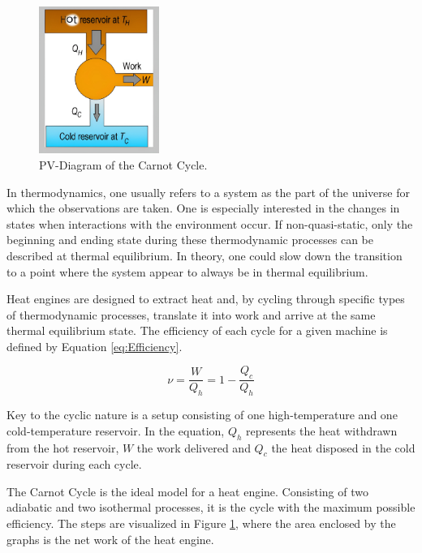 \begin{figure}  %
    \centering
    \vspace{-0.75cm}
    \includegraphics[width=0.35\textwidth]{Graphics/Heat_Engine.png}  %
    \caption{PV-Diagram of the Carnot Cycle. \cite{Bassie2012-pw}}
    \label{fig:Carnot Cycle}
\end{figure}

In thermodynamics, one usually refers to a system as the part of the universe for which the observations are taken. One is especially interested in the changes in states when interactions with the environment occur. If non-quasi-static, only the beginning and ending state during these thermodynamic processes can be described at thermal equilibrium. In theory, one could slow down the transition to a point where the system appear to always be in thermal equilibrium. \cite{Ling2016-bs}

Heat engines are designed to extract heat and, by cycling through specific types of thermodynamic processes, translate it into work and arrive at the same thermal equilibrium state. The efficiency of each cycle for a given machine is defined by Equation \ref{eq:Efficiency}.

\begin{equation}
\label{eq:Efficiency}
    \mathit{\nu = \frac{W}{Q_h} = 1 - \frac{Q_c}{Q_h}}
\end{equation}

Key to the cyclic nature is a setup consisting of one high-temperature and one cold-temperature reservoir. In the equation, $\mathit{Q_h}$ represents the heat withdrawn from the hot reservoir, $\mathit{W}$ the work delivered and $\mathit{Q_c}$ the heat disposed in the cold reservoir during each cycle. 

The Carnot Cycle is the ideal model for a heat engine. Consisting of two adiabatic and two isothermal processes, it is the cycle with the maximum possible efficiency. The steps are visualized in Figure \ref{fig:Carnot Cycle}, where the area enclosed by the graphs is the net work of the heat engine.

